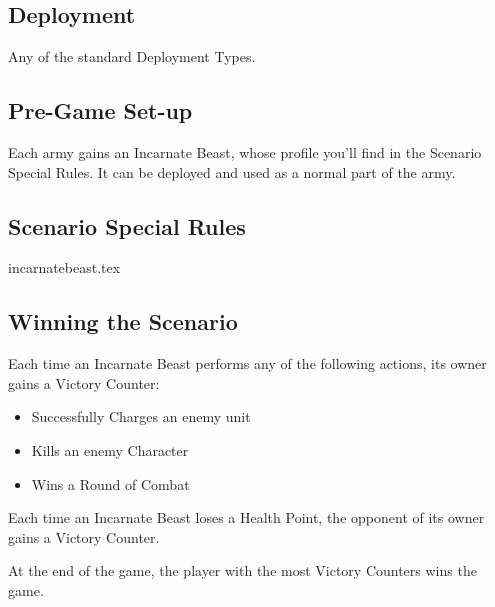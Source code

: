 
\label{DivineIntervention}


\subsection*{Deployment}

Any of the standard Deployment Types.

\subsection*{Pre-Game Set-up}

Each army gains an Incarnate Beast, whose profile you'll find in the Scenario Special Rules. It can be deployed and used as a normal part of the army.

\subsection*{Scenario Special Rules}

\newcommand{\incarnatebeast}{Incarnate Beast}

{incarnatebeast.tex}

\subsection*{Winning the Scenario}

Each time an Incarnate Beast performs any of the following actions, its owner gains a Victory Counter:

\begin{itemize}
\item Successfully Charges an enemy unit
\item Kills an enemy Character
\item Wins a Round of Combat
\end{itemize}

Each time an Incarnate Beast loses a Health Point, the opponent of its owner gains a Victory Counter.

At the end of the game, the player with the most Victory Counters wins the game.


